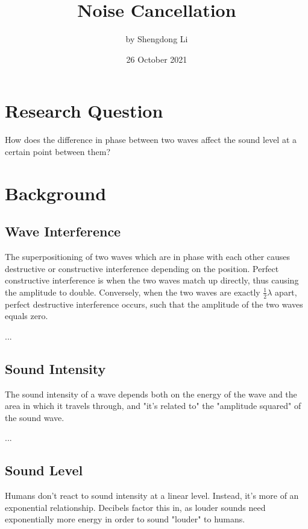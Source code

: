 \documentclass[12pt]{article}
\begin{document}
\title{Noise Cancellation}
\author{by Shengdong Li}
\date{26 October 2021}
\maketitle

\section{Research Question}

How does the difference in phase between two waves affect the sound level at a certain point between them?

\section{Background}

\subsection{Wave Interference}

The superpositioning of two waves which are in phase with each other causes destructive or constructive interference depending on the position. Perfect constructive interference is when the two waves match up directly, thus causing the amplitude to double. Conversely, when the two waves are exactly \(\frac{1}{2}\lambda\) apart, perfect destructive interference occurs, such that the amplitude of the two waves equals zero.

...

\subsection{Sound Intensity}

The sound intensity of a wave depends both on the energy of the wave and the area in which it travels through, and "it's related to" the "amplitude squared" of the sound wave.

...

\subsection{Sound Level}

Humans don't react to sound intensity at a linear level. Instead, it's more of an exponential relationship. Decibels factor this in, as louder sounds need exponentially more energy in order to sound "louder" to humans.
\end{document}

